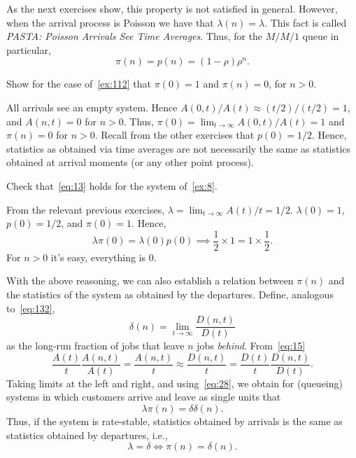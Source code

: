 As the next exercises show, this property is not satisfied in general.
However, when the arrival process is Poisson we have that $\lambda(n)=\lambda$.
This fact is called \emph{PASTA: Poisson Arrivals See Time Averages}.
Thus, for the $M/M/1$ queue in particular,
\begin{equation*}
 \pi(n) = p(n) = (1-\rho)\rho^n.
\end{equation*}

\begin{exercise} 
Show for the case of~\cref{ex:112} that $\pi(0)=1$ and $\pi(n)=0$, for $n>0$.
\begin{solution}
  All arrivals see an empty system.
  Hence $A(0,t)/A(t) \approx (t/2)/(t/2) = 1$, and $A(n,t)=0$ for $n>0$.
  Thus, $\pi(0) = \lim_{t\to\infty} A(0,t)/A(t) = 1$ and $\pi(n)=0$ for $n>0$.
  Recall from the other exercises that $p(0)=1/2$.
  Hence, statistics as obtained via time averages are not necessarily the same as statistics obtained at arrival moments (or any other point process).
\end{solution}

\end{exercise}

\begin{exercise}
 Check that~\cref{eq:13} holds for the system of~\cref{ex:8}.
\begin{solution}
From the relevant previous exercises, $\lambda = \lim_{t\to\infty} A(t)/t = 1/2$. $\lambda(0)=1$, $p(0)=1/2$, and $\pi(0)=1$. Hence,
\begin{equation*}
 \lambda \pi(0) = \lambda(0) p(0) \implies \frac 1 2 \times 1 = 1\times \frac 1 2.
\end{equation*}
For $n>0$ it's easy, everything is 0.
\end{solution}
\end{exercise}





With the above reasoning, we can also establish a relation between $\pi(n)$ and the statistics of the system as obtained by the departures.
Define, analogous to~\cref{eq:132}, 
\begin{equation}
 \label{eq:33}
 \delta(n) = \lim_{t\to\infty} \frac{D(n,t)}{D(t)}
\end{equation}
as the long-run fraction of jobs that leave $n$ jobs \emph{behind}.
From~\cref{eq:15}
\begin{equation*}
\frac{A(t)}t \frac{A(n,t)}{A(t)} = \frac{A(n,t)}t \approx \frac{D(n,t)}t 
= \frac{D(t)}t \frac{D(n,t)}{D(t)}.
\end{equation*}
Taking limits at the left and right, and using~\cref{eq:28}, we obtain for (queueing) systems in which customers arrive and leave as single units that
\begin{equation}
 \label{eq:36}
 \lambda \pi(n) = \delta \delta(n).
\end{equation}
Thus, if the system is rate-stable, statistics obtained by arrivals is the same as statistics obtained by departures, i.e., 
\begin{equation}
 \label{eq:39}
\lambda = \delta \iff \pi(n) = \delta(n).
\end{equation}


